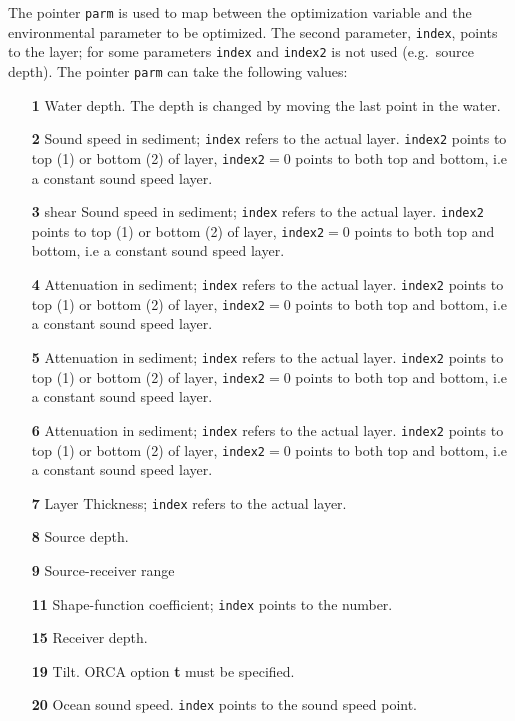 \documentclass{saclantc}
\begin{document}
The pointer {\tt parm} is used to map between the optimization variable and the
environmental parameter to be optimized. The second parameter, {\tt index}, points to the
layer; for some parameters {\tt index} and {\tt index2}  is not used (e.g.\ source depth).  
The pointer {\tt parm} can take the following values:
\begin{itemize}
   \item[\bf 1]  Water depth. The depth is changed by moving the last 
point in the water.
\vspace{-0.3cm}
    \item[\bf 2] Sound speed in sediment; {\tt index} refers to the
    actual layer. {\tt index2} points to top (1) or bottom (2) of
    layer,  {\tt index2}$=0$ points to both top and bottom, i.e a
    constant sound speed layer.
\vspace{-0.3cm}
    \item[\bf 3] shear Sound speed in sediment; {\tt index} refers to the
    actual layer. {\tt index2} points to top (1) or bottom (2) of
    layer,  {\tt index2}$=0$ points to both top and bottom, i.e a
    constant sound speed layer.
\vspace{-0.3cm}
    \item[\bf 4] Attenuation in sediment; {\tt index} refers to the
    actual layer. {\tt index2} points to top (1) or bottom (2) of
    layer,  {\tt index2}$=0$ points to both top and bottom, i.e a
    constant sound speed layer.
    \item[\bf 5] Attenuation in sediment; {\tt index} refers to the
    actual layer. {\tt index2} points to top (1) or bottom (2) of
    layer,  {\tt index2}$=0$ points to both top and bottom, i.e a
    constant sound speed layer.
    \item[\bf 6] Attenuation in sediment; {\tt index} refers to the
    actual layer. {\tt index2} points to top (1) or bottom (2) of
    layer,  {\tt index2}$=0$ points to both top and bottom, i.e a
    constant sound speed layer.
    \item[\bf 7] Layer Thickness; {\tt index} refers to the
    actual layer. 
\vspace{-0.3cm}
    \item[\bf 8] Source depth.
\vspace{-0.3cm}
    \item[\bf 9] Source-receiver range
\vspace{-0.3cm}
    \item[\bf 11] Shape-function coefficient; {\tt index} points to the number.
\vspace{-0.3cm}
    \item[\bf 15]  Receiver depth.
\vspace{-0.3cm}
    \item[\bf 19] Tilt. {\sf ORCA} option {\bf t} must be specified.

\vspace{-0.3cm}
    \item[\bf 20] Ocean sound speed. {\tt index} points to the sound
    speed point.
\end{itemize}
\end{document}
